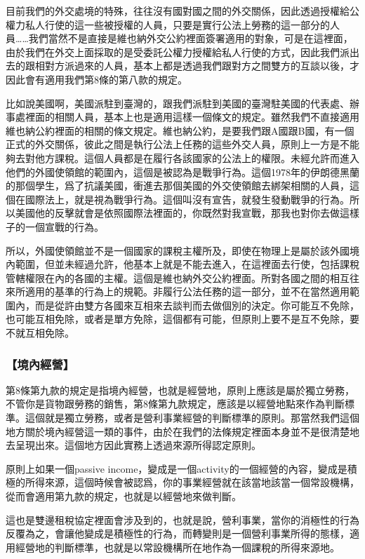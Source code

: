 \documentclass[oneside,sub3section]{ctexbook}
\begin{document}
目前我們的外交處境的特殊，往往沒有國對國之間的外交關係，因此透過授權給公權力私人行使的這一些被授權的人員，只要是實行公法上勞務的這一部分的人員\ldots\ldots 我們當然不是直接是維也納外交公約裡面簽署適用的對象，可是在這裡面，由於我們在外交上面採取的是受委託公權力授權給私人行使的方式，因此我們派出去的跟相對方派過來的人員，基本上都是透過我們跟對方之間雙方的互談以後，才因此會有適用我們第8條的第八款的規定。

比如說美國啊，美國派駐到臺灣的，跟我們派駐到美國的臺灣駐美國的代表處、辦事處裡面的相關人員，基本上也是適用這樣一個條文的規定。雖然我們不直接適用維也納公約裡面的相關的條文規定。維也納公約，是要我們跟A國跟B國，有一個正式的外交關係，彼此之間是執行公法上任務的這些外交人員，原則上一方是不能夠去對他方課稅。這個人員都是在履行各該國家的公法上的權限。未經允許而進入他們的外國使領館的範圍內，這個是被認為是戰爭行為。這個1978年的伊朗德黑蘭的那個學生，爲了抗議美國，衝進去那個美國的外交使領館去綁架相關的人員，這個在國際法上，就是視為戰爭行為。這個叫沒有宣告，就發生發動戰爭的行為。所以美國他的反擊就會是依照國際法裡面的，你既然對我宣戰，那我也對你去做這樣子的一個宣戰的行為。

所以，外國使領館並不是一個國家的課稅主權所及，即使在物理上是屬於該外國境內範圍，但並未經過允許，他基本上就是不能去進入，在這裡面去行使，包括課稅管轄權限在內的各國的主權。這個是維也納外交公約裡面。所對各國之間的相互往來所適用的基準的行為上的規範。非履行公法任務的這一部分，並不在當然適用範圍內，而是從許由雙方各國來互相來去談判而去做個別的決定。你可能互不免除，也可能互相免除，或者是單方免除，這個都有可能，但原則上要不是互不免除，要不就互相免除。

\hypertarget{ux5883ux5167ux7d93ux71df}{%
\subsubsection{【境內經營】}\label{ux5883ux5167ux7d93ux71df}}

第8條第九款的規定是指境內經營，也就是經營地，原則上應該是屬於獨立勞務，不管你是貨物跟勞務的銷售，第8條第九款規定，應該是以經營地點來作為判斷標準。這個就是獨立勞務，或者是營利事業經營的判斷標準的原則。那當然我們這個地方關於境內經營這一類的事件，由於在我們的法條規定裡面本身並不是很清楚地去呈現出來。這個地方因此實務上透過來源所得認定原則。

原則上如果一個passive income，變成是一個activity的一個經營的內容，變成是積極的所得來源，這個時候會被認爲，你的事業經營就在該當地該當一個常設機構，從而會適用第九款的規定，也就是以經營地來做判斷。

這也是雙邊租稅協定裡面會涉及到的，也就是說，營利事業，當你的消極性的行為反覆為之，會讓他變成是積極性的行為，而轉變則是一個營利事業所得的態樣，適用經營地的判斷標準，也就是以常設機構所在地作為一個課稅的所得來源地。
\end{document}

